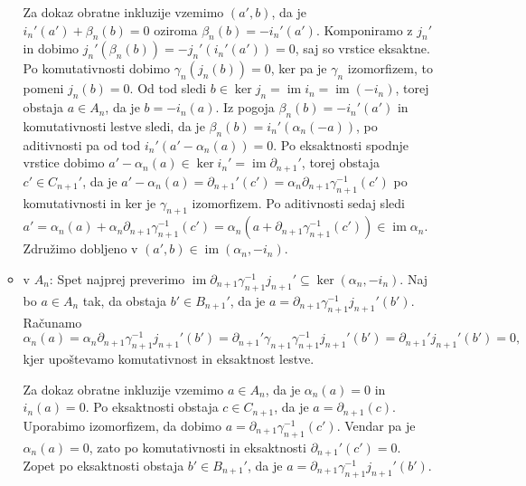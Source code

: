\documentclass[a4paper, 12pt]{article}
\DeclareMathOperator{\im}{im}
\begin{document}
\begin{enumerate}[label=(\alph*)]
\begin{itemize}
		Za dokaz obratne inkluzije vzemimo $(a', b)$, da je $i_n'(a') + \beta_n(b) = 0$ oziroma $\beta_n(b) = -i_n'(a')$. Komponiramo z $j_n'$ in dobimo $j_n'(\beta_n(b)) = -j_n'(i_n'(a')) = 0$, saj so vrstice eksaktne. Po komutativnosti dobimo $\gamma_n(j_n(b)) = 0$, ker pa je $\gamma_n$ izomorfizem, to pomeni $j_n(b) = 0$. Od tod sledi $b \in \ker j_n = \im i_n = \im (-i_n)$, torej obstaja $a \in A_n$, da je $b = -i_n(a)$. Iz pogoja $\beta_n(b) = -i_n'(a') $ in komutativnosti lestve sledi, da je $\beta_n(b) = i_n'(\alpha_n(-a))$, po aditivnosti pa od tod $i_n'(a' - \alpha_n(a)) = 0$. Po eksaktnosti spodnje vrstice dobimo $a' - \alpha_n(a) \in \ker i_n' = \im \partial_{n+1}'$, torej obstaja $c' \in C_{n+1}'$, da je $a' - \alpha_n(a) = \partial_{n+1}'(c') = \alpha_n\partial_{n+1}\gamma_{n+1}^{-1}(c')$ po komutativnosti in ker je $\gamma_{n+1}$ izomorfizem. Po aditivnosti sedaj sledi $a' = \alpha_n(a) + \alpha_n\partial_{n+1}\gamma_{n+1}^{-1}(c') = \alpha_n(a + \partial_{n+1}\gamma_{n+1}^{-1}(c')) \in \im\alpha_n$. Združimo dobljeno v $(a', b) \in \im(\alpha_n, -i_n)$.
		\item v $A_n$: Spet najprej preverimo $\im\partial_{n+1}\gamma_{n+1}^{-1}j_{n+1}' \subseteq \ker (\alpha_n, -i_n)$. Naj bo $a \in A_n$ tak, da obstaja $b' \in B_{n+1}'$, da je $a = \partial_{n+1}\gamma_{n+1}^{-1}j_{n+1}'(b')$. Računamo
		\[
		\alpha_n(a) = \alpha_n\partial_{n+1}\gamma_{n+1}^{-1}j_{n+1}'(b') = \partial_{n+1}'\gamma_{n+1}\gamma_{n+1}^{-1}j_{n+1}'(b') = \partial_{n+1}'j_{n+1}'(b') = 0,
		\]
		kjer upoštevamo komutativnost in eksaktnost lestve.
		
		Za dokaz obratne inkluzije vzemimo $a \in A_n$, da je $\alpha_n(a) = 0$ in $i_n(a) = 0$. Po eksaktnosti obstaja $c \in C_{n+1}$, da je $a = \partial_{n+1}(c)$. Uporabimo izomorfizem, da dobimo $a = \partial_{n+1}\gamma_{n+1}^{-1}(c')$. Vendar pa je $\alpha_n(a) = 0$, zato po komutativnosti in eksaktnosti $\partial_{n+1}'(c') = 0$. Zopet po eksaktnosti obstaja $b' \in B_{n+1}'$, da je $a = \partial_{n+1}\gamma_{n+1}^{-1}j_{n+1}'(b')$.
		

\end{itemize}
\end{enumerate}
\end{document}
